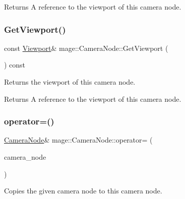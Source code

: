 \begin{DoxyReturn}{Returns}
A reference to the viewport of this camera node. 
\end{DoxyReturn}
\hypertarget{classmage_1_1_camera_node_a09a761526f36b9547d29917835e907d6}{}\label{classmage_1_1_camera_node_a09a761526f36b9547d29917835e907d6} 
\subsubsection{\texorpdfstring{Get\+Viewport()}{GetViewport()}\hspace{0.1cm}{\footnotesize\ttfamily [2/2]}}
{\footnotesize\ttfamily const \hyperlink{classmage_1_1_viewport}{Viewport}\& mage\+::\+Camera\+Node\+::\+Get\+Viewport (\begin{DoxyParamCaption}{ }\end{DoxyParamCaption}) const\hspace{0.3cm}{\ttfamily [noexcept]}}

Returns the viewport of this camera node.

\begin{DoxyReturn}{Returns}
A reference to the viewport of this camera node. 
\end{DoxyReturn}
\hypertarget{classmage_1_1_camera_node_a03442d51e4279717f6692e0a731967a1}{}\label{classmage_1_1_camera_node_a03442d51e4279717f6692e0a731967a1} 
\subsubsection{\texorpdfstring{operator=()}{operator=()}\hspace{0.1cm}{\footnotesize\ttfamily [1/2]}}
{\footnotesize\ttfamily \hyperlink{classmage_1_1_camera_node}{Camera\+Node}\& mage\+::\+Camera\+Node\+::operator= (\begin{DoxyParamCaption}\item[{const \hyperlink{classmage_1_1_camera_node}{Camera\+Node} \&}]{camera\+\_\+node }\end{DoxyParamCaption})\hspace{0.3cm}{\ttfamily [delete]}}

Copies the given camera node to this camera node.


